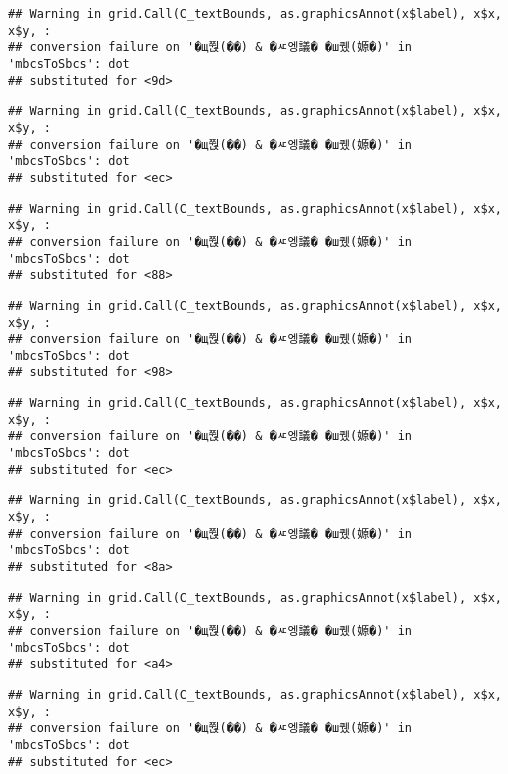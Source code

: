 \documentclass[
]{article}
\begin{document}
\begin{verbatim}
## Warning in grid.Call(C_textBounds, as.graphicsAnnot(x$label), x$x, x$y, :
## conversion failure on '�щ쭩(��) & �ㅼ엥議� �ш퀬(嫄�)' in 'mbcsToSbcs': dot
## substituted for <9d>
\end{verbatim}

\begin{verbatim}
## Warning in grid.Call(C_textBounds, as.graphicsAnnot(x$label), x$x, x$y, :
## conversion failure on '�щ쭩(��) & �ㅼ엥議� �ш퀬(嫄�)' in 'mbcsToSbcs': dot
## substituted for <ec>
\end{verbatim}

\begin{verbatim}
## Warning in grid.Call(C_textBounds, as.graphicsAnnot(x$label), x$x, x$y, :
## conversion failure on '�щ쭩(��) & �ㅼ엥議� �ш퀬(嫄�)' in 'mbcsToSbcs': dot
## substituted for <88>
\end{verbatim}

\begin{verbatim}
## Warning in grid.Call(C_textBounds, as.graphicsAnnot(x$label), x$x, x$y, :
## conversion failure on '�щ쭩(��) & �ㅼ엥議� �ш퀬(嫄�)' in 'mbcsToSbcs': dot
## substituted for <98>
\end{verbatim}

\begin{verbatim}
## Warning in grid.Call(C_textBounds, as.graphicsAnnot(x$label), x$x, x$y, :
## conversion failure on '�щ쭩(��) & �ㅼ엥議� �ш퀬(嫄�)' in 'mbcsToSbcs': dot
## substituted for <ec>
\end{verbatim}

\begin{verbatim}
## Warning in grid.Call(C_textBounds, as.graphicsAnnot(x$label), x$x, x$y, :
## conversion failure on '�щ쭩(��) & �ㅼ엥議� �ш퀬(嫄�)' in 'mbcsToSbcs': dot
## substituted for <8a>
\end{verbatim}

\begin{verbatim}
## Warning in grid.Call(C_textBounds, as.graphicsAnnot(x$label), x$x, x$y, :
## conversion failure on '�щ쭩(��) & �ㅼ엥議� �ш퀬(嫄�)' in 'mbcsToSbcs': dot
## substituted for <a4>
\end{verbatim}

\begin{verbatim}
## Warning in grid.Call(C_textBounds, as.graphicsAnnot(x$label), x$x, x$y, :
## conversion failure on '�щ쭩(��) & �ㅼ엥議� �ш퀬(嫄�)' in 'mbcsToSbcs': dot
## substituted for <ec>
\end{verbatim}
\end{document}
